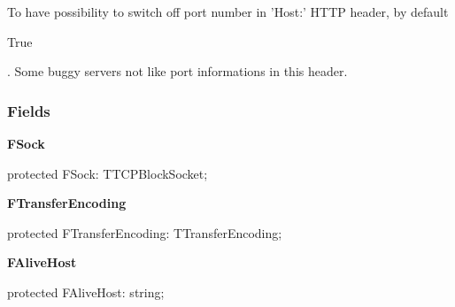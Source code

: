 \documentclass{report}
\newif\ifpdf
\begin{document}
\begin{list}{}
\begin{flushleft}
\ifpdf
\end{flushleft}
\fi


\par To have possibility to switch off port number in 'Host:' HTTP header, by default \begin{ttfamily}True\end{ttfamily}. Some buggy servers not like port informations in this header.\end{list}
\subsubsection*{\large{\textbf{Fields}}\normalsize\hspace{1ex}\hfill}
\begin{list}{}{
\setlength{\itemindent}{0cm}
\setlength{\listparindent}{0cm}
\setlength{\leftmargin}{\evensidemargin}
\addtolength{\leftmargin}{\tmplength}
\settowidth{\labelsep}{X}
\addtolength{\leftmargin}{\labelsep}
\setlength{\labelwidth}{\tmplength}
}
\label{httpsend.THTTPSend-FSock}
\item[\textbf{FSock}\hfill]
\ifpdf
\begin{flushleft}
\fi
\begin{ttfamily}
protected FSock: TTCPBlockSocket;\end{ttfamily}

\ifpdf
\end{flushleft}
\fi


\par  \label{httpsend.THTTPSend-FTransferEncoding}
\item[\textbf{FTransferEncoding}\hfill]
\ifpdf
\begin{flushleft}
\fi
\begin{ttfamily}
protected FTransferEncoding: TTransferEncoding;\end{ttfamily}

\ifpdf
\end{flushleft}
\fi


\par  \label{httpsend.THTTPSend-FAliveHost}
\item[\textbf{FAliveHost}\hfill]
\ifpdf
\begin{flushleft}
\fi
\begin{ttfamily}
protected FAliveHost: string;\end{ttfamily}

\ifpdf
\end{flushleft}
\fi



\end{list}
\end{document}
